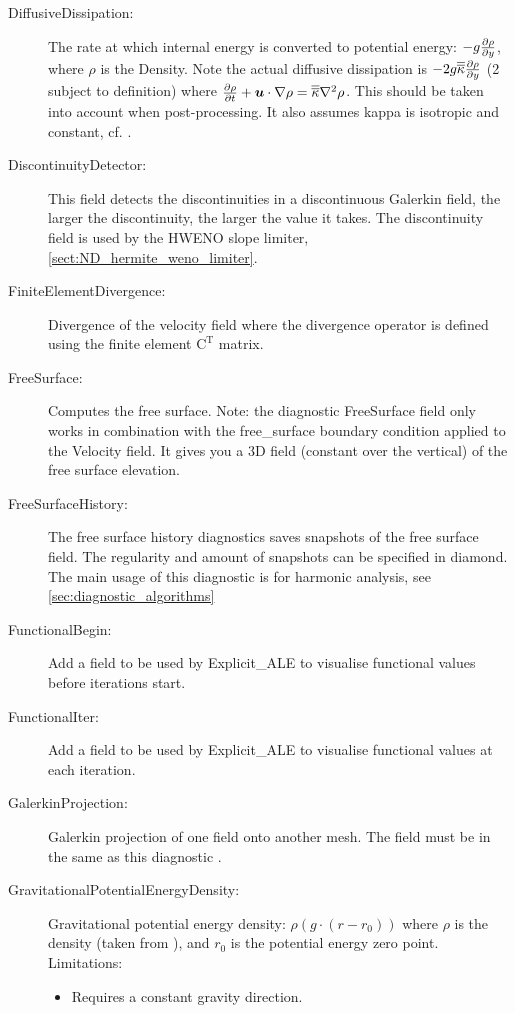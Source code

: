 \begin{description}
\item[DiffusiveDissipation:]The rate at which internal energy is converted to potential energy: $-g\ppx[y]{\rho}$, where $\rho$ is the Density. Note the actual diffusive dissipation is $-2g\tensor{\kappa} \ppx[y]{\rho}$ (2 subject to definition) where $\ppt[t]{\rho} + \vec{u}\cdot \nabla \rho = \tensor{\kappa} \nabla^2 \rho$. This should be taken into account when post-processing. It also assumes kappa is isotropic and constant, cf. \cite{winters1995}.
\item[DiscontinuityDetector:]This field detects the discontinuities in a discontinuous Galerkin field, the larger the discontinuity, the larger the value it takes. The discontinuity field is used by the HWENO slope limiter, \ref{sect:ND_hermite_weno_limiter}.
\item[FiniteElementDivergence:]Divergence of the velocity field where the divergence operator is defined using the finite element $\mathrm{C}^\mathrm{T}$ matrix.
\item[FreeSurface:]Computes the free surface. Note: the diagnostic FreeSurface field only works in combination with the free\_surface boundary condition applied to the Velocity field. It gives you a 3D field (constant over the vertical) of the free surface elevation.
\item[FreeSurfaceHistory:]The free surface history diagnostics saves snapshots of the free surface field. The regularity and amount of snapshots can be specified in diamond. The main usage of this diagnostic is for harmonic analysis, see \ref{sec:diagnostic_algorithms}
\item[FunctionalBegin:]Add a field to be used by Explicit\_ALE to visualise functional values before iterations start.  
\item[FunctionalIter:]Add a field to be used by Explicit\_ALE to visualise functional values at each iteration.
\item[GalerkinProjection:]Galerkin projection of one field onto another mesh. The field must be in the same  as this diagnostic .
\item[GravitationalPotentialEnergyDensity:]Gravitational potential energy density: $\rho(g \cdot (r - r_0))$ where $\rho$ is the density (taken from ), and $r_0$ is the potential energy zero point. \\
	Limitations: \begin{itemize}
	\item Requires a constant gravity direction. 

\end{itemize}
\end{description}
